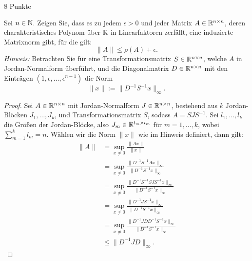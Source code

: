 \documentclass{problemset}
\author{Michael van Straten}
\begin{document}
\maketitle

\setcounter{problem}{2}

\begin{problem}{8 Punkte}

Sei \( n \in \mathbb{N} \). Zeigen Sie, dass es zu jedem \( \epsilon > 0 \) und
jeder Matrix \( A \in \mathbb{R}^{n \times n} \), deren charakteristisches Polynom
über \( \mathbb{R} \) in Linearfaktoren zerfällt, eine induzierte Matrixnorm gibt,
für die gilt:
\[
    \|A\| \leq \rho(A) + \epsilon.
\]
\textit{Hinweis:}
Betrachten Sie für eine Transformationsmatrix \( S \in \mathbb{R}^{n \times n} \),
welche \( A \) in Jordan-Normalform überführt, und die Diagonalmatrix \( D \in
\mathbb{R}^{n \times n} \) mit den Einträgen \( (1, \epsilon, \dots,
\epsilon^{n-1}) \) die Norm
\[
    \|x\| := \|D^{-1} S^{-1} x\|_\infty.
\]
\begin{proof}
    Sei \( A \in \mathbb{R}^{n \times n} \) mit Jordan-Normalform \( J \in
    \mathbb{R}^{n \times n} \), bestehend aus \( k \) Jordan-Blöcken \( J_1,
    \ldots, J_k \), und Transformationsmatrix \( S \), sodass \( A = S J S^{-1}
    \). Sei \( l_1, \ldots, l_k \) die Größen der Jordan-Blöcke, also \( J_m
    \in \mathbb{R}^{l_m \times l_m} \) für \( m = 1, \ldots, k \), wobei \(
    \sum_{m=1}^k l_m = n \). Wählen wir die Norm \( \|x\| \) wie im Hinweis
    definiert, dann gilt:
    \begin{align*}
        \|A\| & = \sup_{x \neq 0} \frac{\|Ax\|}{\|x\|}                                                     \\
              & = \sup_{x \neq 0} \frac{\|D^{-1} S^{-1} A x\|_\infty}{\|D^{-1} S^{-1} x\|_\infty}          \\
              & = \sup_{x \neq 0} \frac{\|D^{-1} S^{-1} S J S^{-1} x\|_\infty}{\|D^{-1} S^{-1} x\|_\infty} \\
              & = \sup_{x \neq 0} \frac{\|D^{-1} J S^{-1} x\|_\infty}{\|D^{-1} S^{-1} x\|_\infty}          \\
              & = \sup_{x \neq 0} \frac{\|D^{-1} J D D^{-1} S^{-1} x\|_\infty}{\|D^{-1} S^{-1} x\|_\infty} \\
              & \leq \|D^{-1} J D\|_\infty.
    \end{align*}


\end{proof}
\end{problem}
\end{document}
